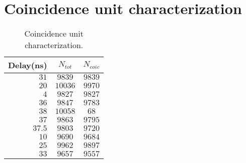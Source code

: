 \section{Coincidence unit characterization}
\label{app:Coincidence Unit}
\begin{table}[!htp]
	\centering
	\begin{tabular}{r|cc}
		\toprule
		Delay(ns)&$N_{tot}$&$N_{coic}$\\
		\midrule
		$31$ &   $9839$ &    $9839$ \\
		$20$ &  $ 10036$ & $  9970$ \\
		$4 $ &  $ 9827$ &  $  9827$\\
		$36$ &   $9847$ &   $ 9783$ \\
		$38 $ &  $10058$ &   $68$ \\
		$37$ &   $9863 $ &  $ 9795$ \\
		$37.5$ & $ 9803$ &  $ 9720$ \\
		$10$ &   $9690$ &   $ 9684$ \\
		$25$ &  $ 9962$ &   $ 9897$ \\
		$33$ &   $9657$ &   $ 9557$ \\

		\bottomrule	
	\end{tabular}
	\caption{Coincidence unit characterization.}
	\label{tab:Coinc Unit }
\end{table}
